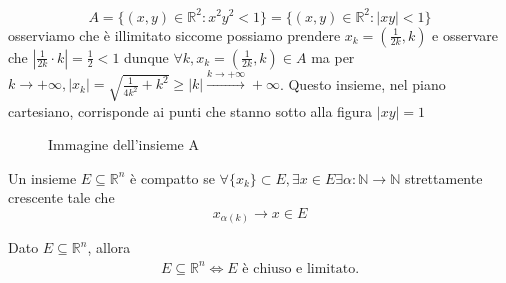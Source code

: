 \begin{example}
$$
A = \{(x, y) \in \mathbb{R}^2: x^2 y^2 < 1 \} = \{ (x, y) \in \mathbb{R}^2 : |xy| < 1 \}
$$
osserviamo che è illimitato siccome possiamo prendere $x_k = (\frac{1}{2k}, k)$ e osservare che $|\frac{1}{2k} \cdot k| = \frac{1}{2} < 1$ dunque $\forall k, x_k = (\frac{1}{2k}, k) \in A$ ma per $k \to +\infty, |x_k| = \sqrt{\frac{1}{4k^2} + k^2} \geq |k| \stackrel{k \to +\infty}{\to} +\infty$. 
Questo insieme, nel piano cartesiano, corrisponde ai punti che stanno sotto alla figura $|xy| = 1$
\begin{figure}[H]
	\centering
	  \caption{Immagine dell'insieme A}
	  \label{fig:set_A}
\end{figure}
\end{example}
\begin{definition}
	Un insieme $E \subseteq \mathbb{R}^n$ è compatto se $\forall \{x_k \} \subset E, \exists x \in E \exists \alpha: \mathbb{N} \to \mathbb{N}$ strettamente crescente tale che
	$$
	x_{\alpha(k)} \to x \in E
	$$
\end{definition}
\begin{theorem}
	Dato $E \subseteq \mathbb{R}^n$, allora 
	\begin{align*}
		E \subseteq \mathbb{R}^n \iff E \text{ è chiuso e limitato.}
	\end{align*}
\end{theorem}

